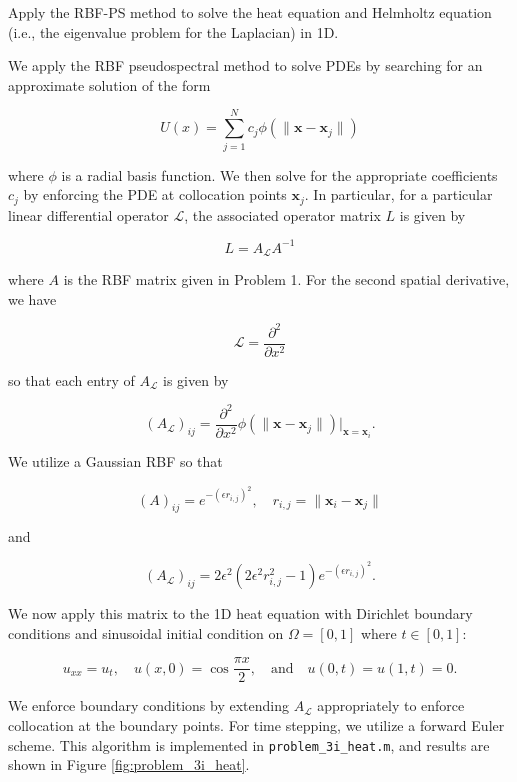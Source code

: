 Apply the RBF-PS method to solve the heat equation and Helmholtz equation (i.e., the eigenvalue problem for the 
Laplacian) in 1D.

\begin{solution}
    We apply the RBF pseudospectral method to solve PDEs by searching for an approximate solution of the form

    \begin{equation}\label{eq:rbf-approximation}
        U(x) = \sum\limits_{j=1}^N c_j \phi(\lVert \bm{x} - \bm{x}_j \rVert)
    \end{equation}

    where $\phi$ is a radial basis function. We then solve for the appropriate coefficients $c_j$ by enforcing the PDE 
    at collocation points $\bm{x}_j$. In particular, for a particular linear differential operator $\mathcal{L}$,
    the associated operator matrix $L$ is given by

    $$
    L = A_{\mathcal{L}} A^{-1}
    $$

    where $A$ is the RBF matrix given in Problem 1. For the second spatial derivative, we have

    $$
    \mathcal{L} = \frac{\partial^2}{\partial x^2}
    $$

    so that each entry of $A_{\mathcal{L}}$ is given by

    $$
    (A_{\mathcal{L}})_{ij} = \frac{\partial^2}{\partial x^2} \phi(\lVert \bm{x} - \bm{x}_j \rVert)\bigg|_{\bm{x} = \bm{x}_i}.
    $$

    We utilize a Gaussian RBF so that

    $$
    (A)_{ij} = e^{-(\epsilon r_{i,j})^2}, \quad r_{i,j} = \lVert \bm{x}_i - \bm{x}_j \rVert
    $$

    and

    $$
    (A_{\mathcal{L}})_{ij} = 2 \epsilon^2 \left(2 \epsilon^2 r_{i,j}^2 - 1 \right) e^{-(\epsilon r_{i,j})^2}.
    $$

    We now apply this matrix to the 1D heat equation with Dirichlet boundary conditions and sinusoidal initial 
    condition on $\Omega = [0, 1]$ where $t \in [0, 1]$: 
    
    $$
    u_{xx} = u_t,  \quad u(x, 0) = \cos{\frac{\pi x}{2}}, \quad \text{and} \quad u(0, t) = u(1, t) = 0. 
    $$

    We enforce boundary conditions by extending $A_{\mathcal{L}}$ appropriately to enforce collocation at the boundary 
    points. For time stepping, we utilize a forward Euler scheme. This algorithm is implemented in 
    \texttt{problem\_3i\_heat.m}, and results are shown in Figure \ref{fig:problem_3i_heat}.
    

\end{solution}
